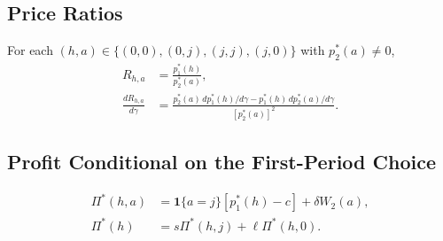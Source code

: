 \documentclass[12pt]{article}
\theoremstyle{definition}
\theoremstyle{remark}
\begin{document}
\subsection{Price Ratios}
For each $(h,a)\in\{(0,0),(0,j),(j,j),(j,0)\}$ with $p_2^*(a)\ne0$,
\begin{align}
 R_{h,a}&=\frac{p_1^*(h)}{p_2^*(a)},\\
 \frac{dR_{h,a}}{d\gamma}
 &=\frac{p_2^*(a)\,dp_1^*(h)/d\gamma
 -p_1^*(h)\,dp_2^*(a)/d\gamma}{[p_2^*(a)]^2}.
\end{align}

\subsection{Profit Conditional on the First-Period Choice}
\begin{align}
 \Pi^*(h,a)&=\mathbf{1}\{a=j\}[p_1^*(h)-c]+\delta W_2(a),\\
 \Pi^*(h)&=s\Pi^*(h,j)+\ell\Pi^*(h,0).
\end{align}
\end{document}

